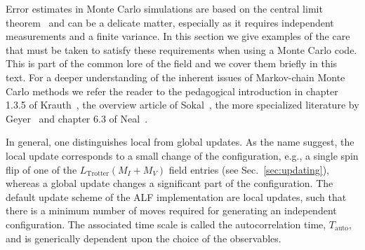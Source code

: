

Error estimates in Monte Carlo simulations are based on the central limit theorem~\cite{Negele} and can be a delicate matter, especially as it requires independent measurements and a finite variance. In this section we give examples of the care that must be taken to satisfy these requirements when using a Monte Carlo code. This is part of the common lore of the field and we cover them briefly in this text.
For a deeper understanding of the inherent issues of Markov-chain Monte Carlo methods we refer the reader to the pedagogical introduction in chapter 1.3.5 of Krauth~\cite{Krauth2006}, the overview article of Sokal~\cite{Sokal89},  the more specialized literature by Geyer~\cite{Geyer1992} and chapter 6.3 of Neal~\cite{neal1993}.

In general, one distinguishes local from global updates. As the name suggest, the local update corresponds to a small change of the configuration, e.g., a single spin flip of one of the $L_{\mathrm{Trotter}}(M_I+M_V)$ field entries (see Sec.~\ref{sec:updating}), whereas a global update changes a significant part of the configuration. The default update scheme of the ALF implementation are local updates, such that there is a minimum number of moves required for generating an independent configuration. The associated time scale is called  the autocorrelation time, $T_\mathrm{auto}$, and is generically dependent upon the choice of the observables. 

